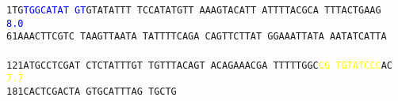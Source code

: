 \documentclass[11pt,twoside,reqno,a4paper]{article}
\begin{document}
\texttt{1\hspace*{3\charwidth}TG\textcolor{Blue}{T}\textcolor{Blue}{G}\textcolor{Blue}{G}\textcolor{Blue}{C}\textcolor{Blue}{A}\textcolor{Blue}{T}\textcolor{Blue}{A}\textcolor{Blue}{T}	\textcolor{Blue}{G}\textcolor{Blue}{T}GTATATTT	TCCATATGTT	AAAGTACATT	ATTTTACGCA	TTTACTGAAG	\\
\hspace*{4\charwidth}\hspace*{2\charwidth}\textcolor{Blue}{8.0}\hspace*{1\charwidth}\hspace*{1\charwidth}\hspace*{1\charwidth}\hspace*{1\charwidth}\hspace*{1\charwidth}\hspace*{1\charwidth}\\
61\hspace*{2\charwidth}AAACTTCGTC	TAAGTTAATA	TATTTTCAGA	CAGTTCTTAT	GGAAATTATA	AATATCATTA	\\
\hspace*{4\charwidth}\hspace*{1\charwidth}\hspace*{1\charwidth}\hspace*{1\charwidth}\hspace*{1\charwidth}\hspace*{1\charwidth}\hspace*{1\charwidth}\\
121\hspace*{1\charwidth}ATGCCTCGAT	CTCTATTTGT	TGTTTACAGT	ACAGAAACGA	TTTTTGGC\textcolor{Yellow}{C}\textcolor{Yellow}{G}	\textcolor{Yellow}{T}\textcolor{Yellow}{G}\textcolor{Yellow}{T}\textcolor{Yellow}{A}\textcolor{Yellow}{T}\textcolor{Yellow}{C}\textcolor{Yellow}{C}\textcolor{Yellow}{C}AC	\\
\hspace*{4\charwidth}\hspace*{1\charwidth}\hspace*{1\charwidth}\hspace*{1\charwidth}\hspace*{1\charwidth}\hspace*{48\charwidth}\textcolor{Yellow}{7.7}\hspace*{1\charwidth}\hspace*{1\charwidth}\\
181\hspace*{1\charwidth}CACTCGACTA	GTGCATTTAG	TGCTG\\
\hspace*{4\charwidth}\hspace*{1\charwidth}\hspace*{1\charwidth}\\
}
\end{document}
